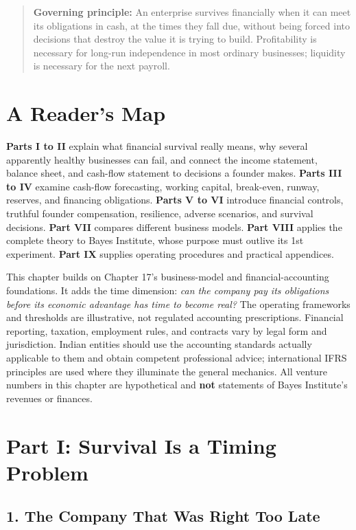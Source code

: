 \begin{quote}
\small\textbf{Governing principle:} An enterprise survives financially when it can meet its obligations in cash, at the times they fall due, without being forced into decisions that destroy the value it is trying to build. Profitability is necessary for long-run independence in most ordinary businesses; liquidity is necessary for the next payroll.
\end{quote}

\section*{A Reader's Map}

\textbf{Parts I to II} explain what financial survival really means, why several apparently healthy businesses can fail, and connect the income statement, balance sheet, and cash-flow statement to decisions a founder makes. \textbf{Parts III to IV} examine cash-flow forecasting, working capital, break-even, runway, reserves, and financing obligations. \textbf{Parts V to VI} introduce financial controls, truthful founder compensation, resilience, adverse scenarios, and survival decisions. \textbf{Part VII} compares different business models. \textbf{Part VIII} applies the complete theory to Bayes Institute, whose purpose must outlive its 1st experiment. \textbf{Part IX} supplies operating procedures and practical appendices.

This chapter builds on Chapter 17's business-model and financial-accounting foundations. It adds the time dimension: \emph{can the company pay its obligations before its economic advantage has time to become real?} The operating frameworks and thresholds are illustrative, not regulated accounting prescriptions. Financial reporting, taxation, employment rules, and contracts vary by legal form and jurisdiction. Indian entities should use the accounting standards actually applicable to them and obtain competent professional advice; international IFRS principles are used where they illuminate the general mechanics. All venture numbers in this chapter are hypothetical and \textbf{not} statements of Bayes Institute's revenues or finances.

\section*{Part I: Survival Is a Timing Problem}

\subsection*{1. The Company That Was Right Too Late}

